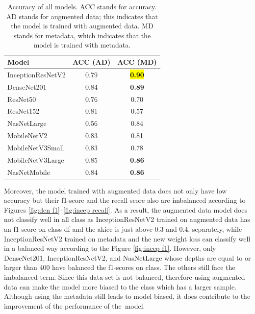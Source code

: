 \documentclass[sensors,article,accept,pdftex,moreauthors]{Definitions/mdpi}
\begin{document}
	\begin{table}[H]
		\caption{Accuracy of all models. ACC stands for accuracy. AD stands for augmented data; this indicates that the model is trained with augmented data. MD stands for metadata, which indicates that the model is trained with metadata.}
		\label{table:overall-acc}
		\setlength{\tabcolsep}{12.38mm}\begin{tabular}{ l  c  c  }
\toprule
\textbf{Model} & \textbf{ACC (AD)} & \textbf{ACC (MD)}\\ 
\midrule
InceptionResNetV2 & 0.79 & \textbf{\hl{0.90} %
}\\
\midrule
DenseNet201 & 0.84 & \textbf{0.89}\\
\midrule
ResNet50 & 0.76 & 0.70\\
\midrule
ResNet152 & 0.81 & 0.57\\
\midrule
NasNetLarge & 0.56 & 0.84\\
\midrule
MobileNetV2 & 0.83 & 0.81\\
\midrule
MobileNetV3Small & 0.83 & 0.78\\
\midrule
MobileNetV3Large & 0.85 & \textbf{0.86}\\
\midrule
NasNetMobile & 0.84 & \textbf{0.86}\\
\bottomrule
		\end{tabular}
	\end{table}
	
	Moreover, the model trained with augmented data does not only have low accuracy but their f1-score and the recall score also are imbalanced according to Figures \ref{fig:den f1}--\ref{fig:incep recall}. As a result, the augmented data model does not classify well in all class as InceptionResNetV2 trained on augmented data has an f1-score on class df and the akiec is just above $0.3$ and $0.4$, separately, while InceptionResNetV2 trained on metadata and the new weight loss can classify well in a balanced way according to the Figure \ref{fig:incep f1}. However, only DenseNet201, InceptionResNetV2, and NasNetLarge whose depths are equal to or larger than 400 have balanced the f1-scores on class. The others still face the imbalanced term. Since this data set is not balanced, therefore using augmented data can make the model more biased to the class which has a larger sample. Although using the metadata still leads to model biased, it does contribute to the improvement of the performance of the~model.
	
\end{document}

